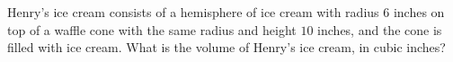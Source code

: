 Henry's ice cream consists of a hemisphere of ice cream with radius $6$ inches on top of a waffle cone with the same radius and height $10$ inches, and the cone is filled with ice cream. What is the volume of Henry's ice cream, in cubic inches?
